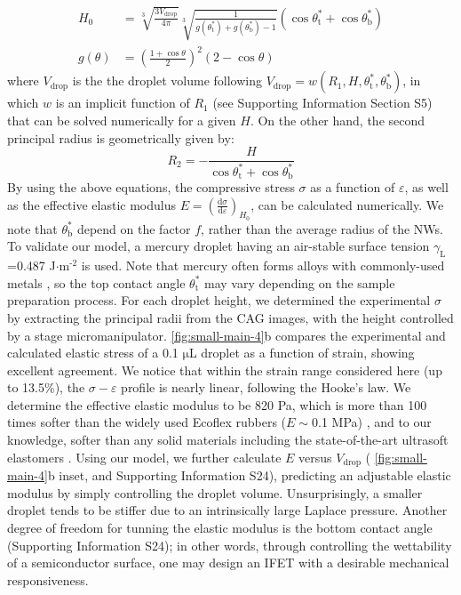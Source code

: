   \begin{equation}
  \label{eq:small-H0}
  \begin{aligned}
    H_{0} &= \sqrt[3]{\frac{3 V_{\mathrm{drop}}}{4 \pi}} \sqrt[3]{\frac{1}{ 
   g(\theta_{\mathrm{t}}^{*}) + g(\theta_{\mathrm{b}}^{*}) -1 }}  \left(\cos \theta_{\mathrm{t}}^{*} + \cos \theta_{\mathrm{b}}^{*
}\right) \\
    g(\theta) &= \left(\frac{1 + \cos \theta}{2} \right)^{2} \left(2 - \cos \theta \right)
  \end{aligned}
  \end{equation}
where \(V_{\mathrm{drop}}\) is the the droplet volume following
\(V_{\mathrm{drop}} = w(R_{1}, H, \theta_{\mathrm{t}}^{*},
  \theta_{\mathrm{b}}^{*})\), in which \(w\) is an implicit function of
\(R_{1}\) (see Supporting Information Section S5) that can be solved
numerically for a given \(H\). On the other hand, the second principal
radius is geometrically given by:
\begin{equation}
\label{eq:small-1}
R_{2} = -\frac{H}{\cos \theta_{\mathrm{t}}^{*} + \cos \theta_{\mathrm{b}}^{*}}
\end{equation}
By using the above equations, the compressive stress \(\sigma\) as a
function of \(\varepsilon\), as well as the effective elastic modulus
\(E = \left({\displaystyle \frac{\mathrm{d} \sigma}{\mathrm{d}
  \varepsilon}}\right)_{H_{0}}\), can be calculated numerically. We
note that \(\theta^{*}_{\mathrm{b}}\) depend on the factor \(f\), rather
than the average radius of the NWs.  To validate our model, a
mercury droplet having an air-stable surface tension
\(\gamma_{\mathrm{L}}\)=0.487 J\(\cdot\)m\(^{\text{-2}}\) is used. Note that
mercury often forms alloys with commonly-used metals
\cite{Kieffer_1959}, so the top contact angle
\(\theta_{\mathrm{t}}^{*}\) may vary depending on the sample
preparation process. For each droplet height, we determined the
experimental \(\sigma\) by extracting the principal radii from the CAG
images, with the height controlled by a stage
micromanipulator.  \autoref{fig:small-main-4}b compares the experimental
and calculated elastic stress of a 0.1 \(\mathrm{\mu}\)L droplet as
a function of strain, showing excellent agreement. We notice that
within the strain range considered here (up to 13.5\%), the \(\sigma -
  \varepsilon\) profile is nearly linear, following the Hooke's law. We
determine the effective elastic modulus to be 820 Pa, which is more
than 100 times softer than the widely used Ecoflex rubbers
(\(E\sim{}\)0.1 MPa) \cite{Mosadegh_2014_soft_robot}, and to our knowledge, softer than any solid
materials including the state-of-the-art ultrasoft elastomers
\cite{Miriyev_2017_soft_mater,Jang_2015_soft_network}. Using our model, we further calculate
\(E\) versus \(V_{\mathrm{drop}}\) ( \autoref{fig:small-main-4}b inset,
and Supporting Information  S24), predicting an adjustable elastic modulus
by simply controlling the droplet volume. Unsurprisingly, a smaller
droplet tends to be stiffer due to an intrinsically large Laplace
pressure. Another degree of freedom for tunning the elastic modulus
is the bottom contact angle (Supporting Information  S24); in other
words, through controlling the wettability of a semiconductor
surface, one may design an IFET with a desirable mechanical
responsiveness.

